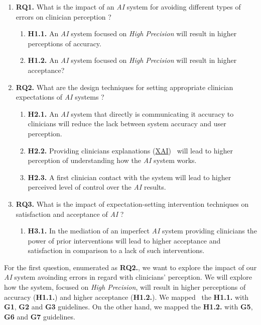 \begin{enumerate}
\item {\bf RQ1.} What is the impact of an {\it AI} system for avoiding different types of errors on clinician perception ?
\begin{enumerate}
\item {\bf H1.1.} An {\it AI} system focused on {\it High Precision} will result in higher perceptions of accuracy.
\item {\bf H1.2.} An {\it AI} system focused on {\it High Precision} will result in higher acceptance?
\end{enumerate}
\item {\bf RQ2.} What are the design techniques for setting appropriate clinician expectations of {\it AI} systems ?
\begin{enumerate}
\item {\bf H2.1.} An {\it AI} system that directly is communicating it accuracy to clinicians will reduce the lack between system accuracy and user perception. 
\item {\bf H2.2.} Providing clinicians explanations (\hyperlink{https://www.darpa.mil/program/explainable-artificial-intelligence}{XAI})~\cite{gunning2017explainable, holzinger2017we} will lead to higher perception of understanding how the {\it AI} system works.
\item {\bf H2.3.} A first clinician contact with the system will lead to higher perceived level of control over the {\it AI} results.
\end{enumerate}
\item {\bf RQ3.} What is the impact of expectation-setting intervention techniques on satisfaction and acceptance of {\it AI} ?
\begin{enumerate}
\item {\bf H3.1.} In the mediation of an imperfect {\it AI} system providing clinicians the power of prior interventions will lead to higher acceptance and satisfaction in comparison to a lack of such interventions.
\end{enumerate}
\end{enumerate}

For the first question, enumerated as {\bf RQ2.}, we want to explore the impact of our {\it AI} system avoinding errors in regard with clinicians' perception. We will explore how the system, focused on {\it High Precision}, will result in higher perceptions of accuracy ({\bf H1.1.}) and higher acceptance ({\bf H1.2.}). We mapped~\cite{amershi2019guidelines} the {\bf H1.1.} with {\bf G1}, {\bf G2} and {\bf G3} guidelines. On the other hand, we mapped the {\bf H1.2.} with {\bf G5}, {\bf G6} and {\bf G7} guidelines.

